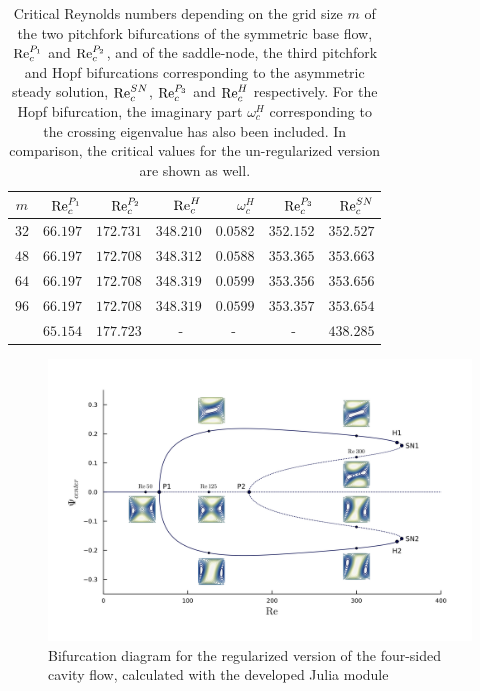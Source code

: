 \begin{table}[h!]
  \centering
  \caption{Critical Reynolds numbers depending on the grid size $m$ of the two
    pitchfork bifurcations of the symmetric base flow, $\mathrm{Re}_c^{P_1}$ and
    $\mathrm{Re}_c^{P_2}$, and of the saddle-node, the third pitchfork and Hopf
    bifurcations corresponding to the asymmetric steady solution,
    $\mathrm{Re}_c^{SN}$, $\mathrm{Re}_c^{P_3}$ and $\mathrm{Re}_c^{H}$ respectively. For the Hopf
    bifurcation, the imaginary part $\omega_c^{H}$ corresponding to the crossing
    eigenvalue has also been included. In comparison, the critical values for the
    un-regularized version are shown as well.}
  \label{tab:re_crit}
\begin{tabular}{crrrrrr}
$m$ & $\mathrm{Re}_c^{P_1}$ & $\mathrm{Re}_c^{P_2}$ & $\mathrm{Re}_c^{H}$ &  $\omega_c^{H}$ & $\mathrm{Re}_c^{P_3}$ & $\mathrm{Re}_c^{SN}$  \\
\hline
$32$ & $66.197$ & $172.731$ & $348.210$ & $0.0582$ & $352.152$ & $352.527$ \\
$48$ & $66.197$ & $172.708$ & $348.312$ & $0.0588$ & $353.365$ & $353.663$ \\
$64$ & $66.197$ & $172.708$ & $348.319$ & $0.0599$ & $353.356$ & $353.656$ \\
$96$ & $66.197$ & $172.708$ & $348.319$ & $0.0599$ & $353.357$ & $353.654$ \\
\citet{chen2013} & $65.154$ & $177.723$ & - $\quad$ & - $\quad$ & - $\quad$ & $438.285$ \\
\end{tabular}
\end{table}

\begin{figure}[h!]
  \centering
  \includegraphics[width=\textwidth]{figs/bifurcation_diag64x64.png}
  \caption{Bifurcation diagram for the regularized version of the four-sided
    cavity flow, calculated with the developed Julia module} 
  \label{fig:bif_diag}
\end{figure}

